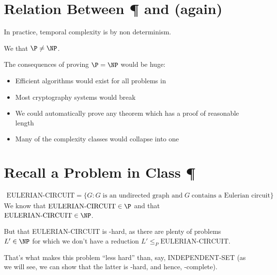 \documentclass[a4paper]{report}
\theoremstyle{definition}
\begin{document}
\section{Relation Between \P{} and \NP{} (again)}
In practice, temporal complexity is  by non determinism.

We  that $\P \neq \NP$.

The consequences of proving $\P = \NP$ would be huge:
\begin{itemize}
\item Efficient algorithms would exist for all problems in \NP
\item Most cryptography systems would break
\item We could automatically prove any theorem which has a proof of reasonable length
\item Many of the complexity classes would collapse into one
\end{itemize}

\section{Recall a Problem in Class \P}
\vspace{-0.3cm}%
\begin{align*}
\text{EULERIAN-CIRCUIT} = \{G : G \;\text{is an undirected graph and} \; G \; \text{contains a Eulerian circuit}\}
\end{align*}
%
We know that $\text{EULERIAN-CIRCUIT} \in \P$ and that $\text{EULERIAN-CIRCUIT} \in \NP$.

But  that EULERIAN-CIRCUIT is \NP-hard, as there are plenty of problems $L' \in \NP$ for which we don't have a reduction $L' \leq_{P} \text{EULERIAN-CIRCUIT}$.

That's what makes this problem ``less hard'' than, say, INDEPENDENT-SET (as we will see, we can show that the latter is \NP-hard, and hence, \NP-complete).
\end{document}

